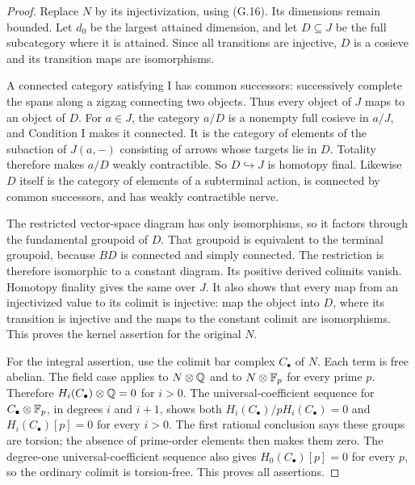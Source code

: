 \begin{proof}
Replace $N$ by its injectivization, using (G.16).  Its dimensions
remain bounded.  Let $d_0$ be the largest attained dimension,
and let $D\subseteq J$ be the full subcategory where it is
attained.  Since all transitions are injective, $D$ is a
cosieve and its transition maps are isomorphisms.

A connected category satisfying I has common successors:
successively complete the spans along a zigzag connecting
two objects.  Thus every object of $J$ maps to an object of
$D$.  For $a\in J$, the category $a/D$ is a nonempty full
cosieve in $a/J$, and Condition I makes it connected.
It is the category of elements of the subaction of
$J(a,-)$ consisting of arrows whose targets lie in $D$.
Totality therefore makes $a/D$ weakly contractible.
So $D\hookrightarrow J$ is homotopy final.
Likewise $D$ itself is the category of elements of a
subterminal action, is connected by common successors, and
has weakly contractible nerve.

The restricted vector-space diagram has only isomorphisms,
so it factors through the fundamental groupoid of $D$.
That groupoid is equivalent to the terminal groupoid, because
$BD$ is connected and simply connected.  The restriction is
therefore isomorphic to a constant diagram.  Its positive
derived colimits vanish.  Homotopy finality gives the same
over $J$.  It also shows that every map from an injectivized
value to its colimit is injective: map the object into $D$,
where its transition is injective and the maps to the
constant colimit are isomorphisms.  This proves the kernel
assertion for the original $N$.

For the integral assertion, use the colimit bar complex
$C_\bullet$ of $N$.  Each term is free abelian.  The field
case applies to $N\otimes\mathbb Q$ and to $N\otimes\mathbb F_p$ for
every prime $p$.  Therefore $H_i(C_\bullet)\otimes\mathbb Q=0$
for $i>0$.  The universal-coefficient sequence for
$C_\bullet\otimes\mathbb F_p$, in degrees $i$ and $i+1$, shows
both $H_i(C_\bullet)/pH_i(C_\bullet)=0$ and
$H_i(C_\bullet)[p]=0$ for every $i>0$.
The first rational conclusion says these groups are torsion;
the absence of prime-order elements then makes them zero.
The degree-one universal-coefficient sequence also gives
$H_0(C_\bullet)[p]=0$ for every $p$, so the ordinary colimit
is torsion-free.  This proves all assertions.
\end{proof}

